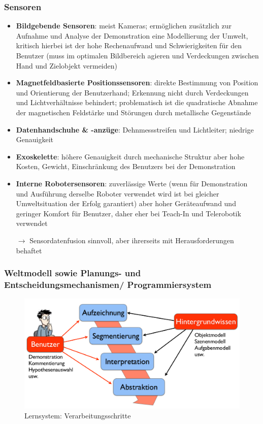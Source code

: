 \subsubsection*{Sensoren}
\begin{itemize}
\item \textbf{Bildgebende Sensoren}: meist Kameras; ermöglichen zusätzlich zur Aufnahme und Analyse der Demonstration eine Modellierung der Umwelt, kritisch hierbei ist der hohe Rechenaufwand und Schwierigkeiten für den Benutzer (muss im optimalen Bildbereich agieren und Verdeckungen zwischen Hand und Zielobjekt vermeiden)
\item \textbf{Magnetfeldbasierte Positionssensoren}: direkte Bestimmung von Position und Orientierung der Benutzerhand; Erkennung nicht durch Verdeckungen und Lichtverhältnisse behindert; problematisch ist die quadratische Abnahme der magnetischen Feldstärke und Störungen durch metallische Gegenstände
\item \textbf{Datenhandschuhe \& -anzüge}: Dehnmessstreifen und Lichtleiter; niedrige Genauigkeit 
\item \textbf{Exoskelette}: höhere Genauigkeit durch mechanische Struktur aber hohe Kosten, Gewicht, Einschränkung des Benutzers bei der Demonstration  
\item \textbf{Interne Robotersensoren}: zuverlässige Werte (wenn für Demonstration und Ausführung derselbe Roboter verwendet wird ist bei gleicher Umweltsituation der Erfolg garantiert) aber hoher Geräteaufwand und geringer Komfort für Benutzer, daher eher bei Teach-In und Telerobotik verwendet
\item[$\rightarrow$] Sensordatenfusion sinnvoll, aber ihrerseits mit Herausforderungen behaftet
\end{itemize}
\subsubsection*{Weltmodell sowie Planungs- und Entscheidungsmechanismen/ Programmiersystem}
\begin{figure}[ht]\centering 
\includegraphics[width=0.6\linewidth]{figures/ch03_verarbeitungsschritte.png}
\caption{Lernsystem: Verarbeitungsschritte}
\label{fig:ch03_verarb}
\end{figure}

